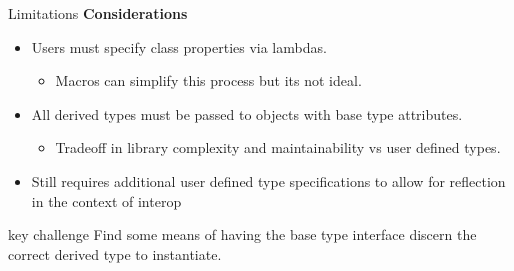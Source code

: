 \begin{frame}{Limitations}
    \textbf{Considerations}
    \begin{itemize}
        \item Users must specify class properties via lambdas. 
        \begin{itemize}
            \item Macros can simplify this process but its not ideal.
        \end{itemize}
        \pause
        \item All derived types must be passed to objects with base type attributes.
        \begin{itemize}
            \item Tradeoff in library complexity and maintainability vs user defined types. 
        \end{itemize} 
        \pause
        \item Still requires additional user defined type specifications to allow for reflection in the context of interop
    \end{itemize}
    \pause
    \begin{block}{key challenge}
        Find some means of having the base type interface discern the correct derived type to instantiate.
    \end{block}
\end{frame}
    
